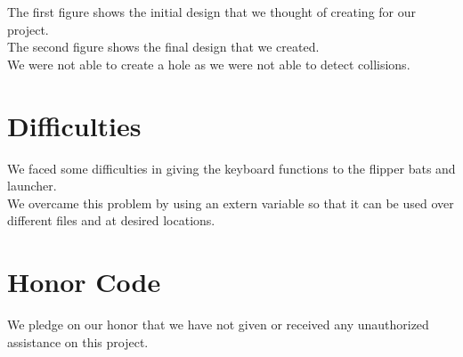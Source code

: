 \documentclass{article}
\begin{document}
    \noindent The first figure shows the initial design that we thought of creating for our project.\\
    The second figure shows the final design that we created.\\
    We were not able to create a hole as we were not able to detect collisions.

    \section{Difficulties}
    \noindent We faced some difficulties in giving the keyboard functions to the flipper bats and launcher.\\
    We overcame this problem by using an extern variable so that it can be used over different files and at desired locations.

    \section{Honor Code}
    We pledge on our honor that we have not given or received any unauthorized assistance on this project.
\end{document}
